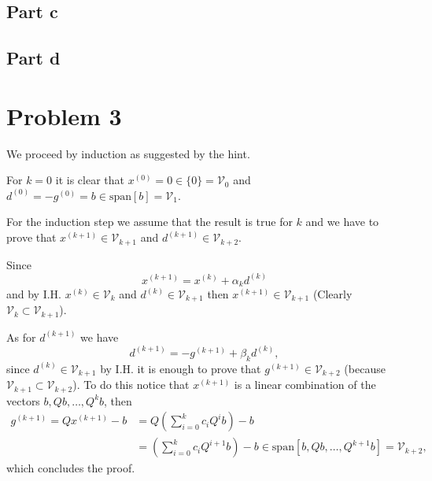 \documentclass{article}
\begin{document}
\subsection*{Part c}
\subsection*{Part d}
\section*{Problem 3}
We proceed by induction as suggested by the hint.

For $k=0$ it is clear that $x^{(0)}=0\in\{0\}=\mathcal{V}_0$ and
$d^{(0)}=-g^{(0)}=b\in \text{span}[b]=\mathcal{V}_1$.

For the induction step we assume that the result is true for $k$ and we have to
prove that $x^{(k+1)}\in \mathcal{V}_{k+1}$ and $d^{(k+1)}\in
\mathcal{V}_{k+2}$.

Since
\[
x^{(k+1)}=x^{(k)}+\alpha_kd^{(k)}
\]
and by I.H. $x^{(k)}\in \mathcal{V}_k$ and $d^{(k)}\in\mathcal{V}_{k+1}$ then
$x^{(k+1)}\in
\mathcal{V}_{k+1}$ (Clearly $\mathcal{V}_k\subset\mathcal{V}_{k+1}$).

As for $d^{(k+1)}$ we have
\[
d^{(k+1)}=-g^{(k+1)}+\beta_k d^{(k)},
\]
since $d^{(k)}\in\mathcal{V}_{k+1}$ by I.H. it is enough to prove that
$g^{(k+1)}\in\mathcal{V}_{k+2}$ (because
$\mathcal{V}_{k+1}\subset\mathcal{V}_{k+2}$). To do this notice that
$x^{(k+1)}$ is a linear combination of the vectors $b,Qb,\dots,Q^{k}b$, then
\begin{align*}
g^{(k+1)}=Qx^{(k+1)}-b&=Q\left(\sum_{i=0}^kc_iQ^ib\right) -b\\
&=\left(\sum_{i=0}^kc_iQ^{i+1}b\right)-b \in
\text{span}[b,Qb,\dots,Q^{k+1}b]=\mathcal{V}_{k+2},
\end{align*}
which concludes the proof.
\end{document}
